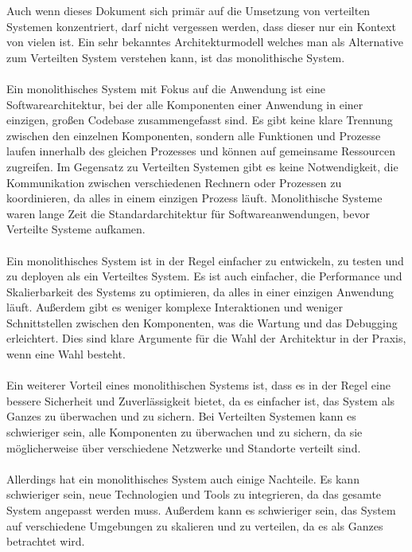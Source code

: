 \documentclass[../vs-script-first-v01.tex]{subfiles}
\begin{document}
Auch wenn dieses Dokument sich primär auf die Umsetzung von verteilten Systemen konzentriert, darf nicht vergessen werden, dass dieser nur ein Kontext von vielen ist. Ein sehr bekanntes Architekturmodell welches man als Alternative zum Verteilten System verstehen kann, ist das monolithische System\cite{Newman2015}. 
\\\\
Ein monolithisches System mit Fokus auf die Anwendung\cite{Szyperski2002} ist eine Softwarearchitektur, bei der alle Komponenten einer Anwendung in einer einzigen, großen Codebase zusammengefasst sind. Es gibt keine klare Trennung zwischen den einzelnen Komponenten, sondern alle Funktionen und Prozesse laufen innerhalb des gleichen Prozesses und können auf gemeinsame Ressourcen zugreifen. Im Gegensatz zu Verteilten Systemen gibt es keine Notwendigkeit, die Kommunikation zwischen verschiedenen Rechnern oder Prozessen zu koordinieren, da alles in einem einzigen Prozess läuft. Monolithische Systeme waren lange Zeit die Standardarchitektur für Softwareanwendungen, bevor Verteilte Systeme aufkamen.
\\\\
Ein monolithisches System ist in der Regel einfacher zu entwickeln, zu testen und zu deployen als ein Verteiltes System. Es ist auch einfacher, die Performance und Skalierbarkeit des Systems zu optimieren, da alles in einer einzigen Anwendung läuft. Außerdem gibt es weniger komplexe Interaktionen und weniger Schnittstellen zwischen den Komponenten, was die Wartung und das Debugging erleichtert. Dies sind klare Argumente für die Wahl der Architektur in der Praxis, wenn eine Wahl besteht. 
\\\\
Ein weiterer Vorteil eines monolithischen Systems ist, dass es in der Regel eine bessere Sicherheit und Zuverlässigkeit bietet, da es einfacher ist, das System als Ganzes zu überwachen und zu sichern. Bei Verteilten Systemen kann es schwieriger sein, alle Komponenten zu überwachen und zu sichern, da sie möglicherweise über verschiedene Netzwerke und Standorte verteilt sind.
\\\\
Allerdings hat ein monolithisches System auch einige Nachteile. Es kann schwieriger sein, neue Technologien und Tools zu integrieren, da das gesamte System angepasst werden muss. Außerdem kann es schwieriger sein, das System auf verschiedene Umgebungen zu skalieren und zu verteilen, da es als Ganzes betrachtet wird.
\\\\
\end{document}
